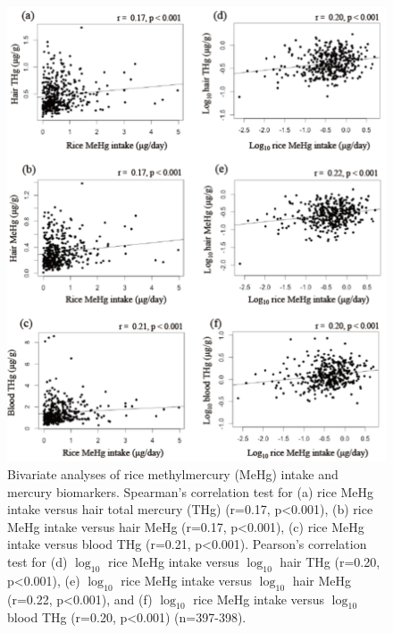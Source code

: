 \begin{figure}
  \centering
    \label{fig:Fig210}
  \includegraphics[scale=1]{Figures/Fig210.pdf}
  \caption[Bivariate analyses of rice methylmercury intake and mercury biomarkers]{Bivariate analyses of rice methylmercury (MeHg) intake and mercury biomarkers. Spearman's correlation test for (a) rice MeHg intake versus hair total mercury (THg) (r=0.17, p<0.001), (b) rice MeHg intake versus hair MeHg (r=0.17, p<0.001), (c) rice MeHg intake versus blood THg (r=0.21, p<0.001). Pearson's correlation test for (d) $\log_{10}$ rice MeHg intake versus $\log_{10}$ hair THg (r=0.20, p<0.001), (e) $\log_{10}$ rice MeHg intake versus $\log_{10}$ hair MeHg (r=0.22, p<0.001), and (f) $\log_{10}$ rice MeHg intake versus $\log_{10}$ blood THg (r=0.20, p<0.001) (n=397-398).}
\end{figure}

